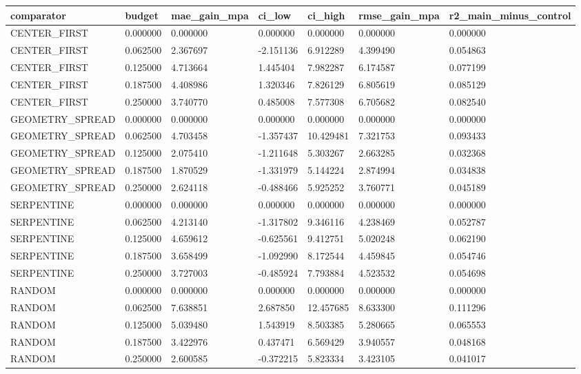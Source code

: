 \begin{tabular}{lllllll}
\hline
comparator & budget & mae\_gain\_mpa & ci\_low & ci\_high & rmse\_gain\_mpa & r2\_main\_minus\_control \\
\hline
CENTER\_FIRST & 0.000000 & 0.000000 & 0.000000 & 0.000000 & 0.000000 & 0.000000 \\
CENTER\_FIRST & 0.062500 & 2.367697 & -2.151136 & 6.912289 & 4.399490 & 0.054863 \\
CENTER\_FIRST & 0.125000 & 4.713664 & 1.445404 & 7.982287 & 6.174587 & 0.077199 \\
CENTER\_FIRST & 0.187500 & 4.408986 & 1.320346 & 7.826129 & 6.805619 & 0.085129 \\
CENTER\_FIRST & 0.250000 & 3.740770 & 0.485008 & 7.577308 & 6.705682 & 0.082540 \\
GEOMETRY\_SPREAD & 0.000000 & 0.000000 & 0.000000 & 0.000000 & 0.000000 & 0.000000 \\
GEOMETRY\_SPREAD & 0.062500 & 4.703458 & -1.357437 & 10.429481 & 7.321753 & 0.093433 \\
GEOMETRY\_SPREAD & 0.125000 & 2.075410 & -1.211648 & 5.303267 & 2.663285 & 0.032368 \\
GEOMETRY\_SPREAD & 0.187500 & 1.870529 & -1.331979 & 5.144224 & 2.874994 & 0.034838 \\
GEOMETRY\_SPREAD & 0.250000 & 2.624118 & -0.488466 & 5.925252 & 3.760771 & 0.045189 \\
SERPENTINE & 0.000000 & 0.000000 & 0.000000 & 0.000000 & 0.000000 & 0.000000 \\
SERPENTINE & 0.062500 & 4.213140 & -1.317802 & 9.346116 & 4.238469 & 0.052787 \\
SERPENTINE & 0.125000 & 4.659612 & -0.625561 & 9.412751 & 5.020248 & 0.062190 \\
SERPENTINE & 0.187500 & 3.658499 & -1.092990 & 8.172544 & 4.459845 & 0.054746 \\
SERPENTINE & 0.250000 & 3.727003 & -0.485924 & 7.793884 & 4.523532 & 0.054698 \\
RANDOM & 0.000000 & 0.000000 & 0.000000 & 0.000000 & 0.000000 & 0.000000 \\
RANDOM & 0.062500 & 7.638851 & 2.687850 & 12.457685 & 8.633300 & 0.111296 \\
RANDOM & 0.125000 & 5.039480 & 1.543919 & 8.503385 & 5.280665 & 0.065553 \\
RANDOM & 0.187500 & 3.422976 & 0.437471 & 6.569429 & 3.940557 & 0.048168 \\
RANDOM & 0.250000 & 2.600585 & -0.372215 & 5.823334 & 3.423105 & 0.041017 \\

\end{tabular}

